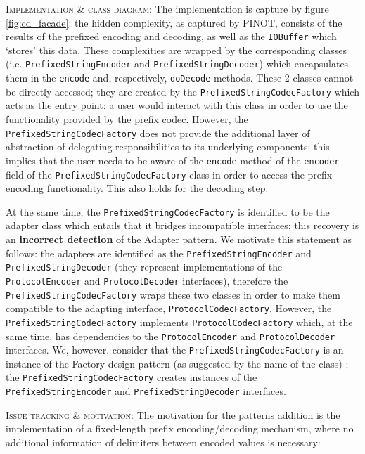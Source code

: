 \textsc{Implementation \& class diagram}: The implementation is capture by figure \ref{fig:cd_facade}; the hidden complexity, as captured by PINOT, consists of the results of the prefixed encoding and decoding, as well as the \texttt{IOBuffer} which `stores' this data. These complexities are wrapped by the corresponding classes (i.e. \texttt{PrefixedStringEncoder} and \texttt{PrefixedStringDecoder}) which encapsulates them in the \texttt{encode} and, respectively, \texttt{doDecode} methods. These 2 classes cannot be directly accessed; they are created by the \texttt{PrefixedStringCodecFactory} which acts as the entry point: a user would interact with this class in order to use the functionality provided by the prefix codec. However, the \texttt{PrefixedStringCodecFactory} does not provide the additional layer of abstraction of delegating responsibilities to its underlying components: this implies that the user needs to be aware of the \texttt{encode} method of the \texttt{encoder} field of the \texttt{PrefixedStringCodecFactory} class in order to access the prefix encoding functionality. This also holds for the decoding step.

At the same time, the \texttt{PrefixedStringCodecFactory} is identified to be the adapter class which entails that it bridges incompatible interfaces; this recovery is an \textbf{incorrect detection} of the Adapter pattern. We motivate this statement as follows: the adaptees are identified as the \texttt{PrefixedStringEncoder} and \texttt{PrefixedStringDecoder} (they represent implementations of the \texttt{ProtocolEncoder} and \texttt{ProtocolDecoder} interfaces), therefore the \texttt{PrefixedStringCodecFactory} wraps these two classes in order to make them compatible to the adapting interface, \texttt{ProtocolCodecFactory}. However, the \texttt{PrefixedStringCodecFactory} implements \texttt{ProtocolCodecFactory} which, at the same time, has dependencies to the \texttt{ProtocolEncoder} and \texttt{ProtocolDecoder} interfaces. We, however, consider that the \texttt{PrefixedStringCodecFactory} is an instance of the Factory design pattern (as suggested by the name of the class) \cite{factory}: the \texttt{PrefixedStringCodecFactory} creates instances of the \texttt{PrefixedStringEncoder} and \texttt{PrefixedStringDecoder} interfaces.

\textsc{Issue tracking \& motivation}: The motivation for the patterns addition is the implementation of a fixed-length prefix encoding/decoding mechanism, where no additional information of delimiters between encoded values is necessary:

